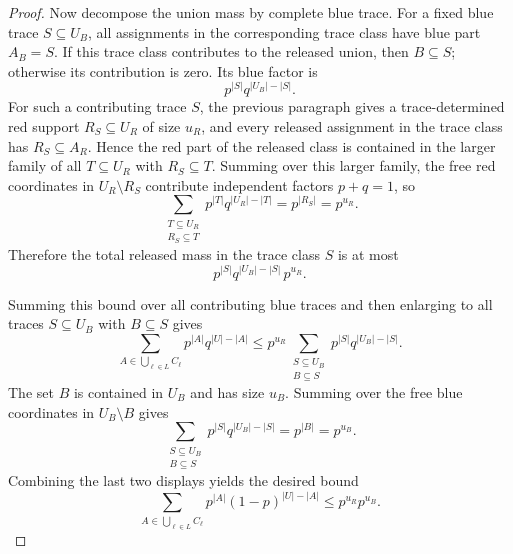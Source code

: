 \begin{proof}
Now decompose the union mass by complete blue trace.  For a fixed blue trace
\(S\subseteq U_B\), all assignments in the corresponding trace class have
blue part \(A_B=S\).  If this trace class contributes to the released union,
then \(B\subseteq S\); otherwise its contribution is zero.  Its blue factor is
\[
p^{|S|}q^{|U_B|-|S|}.
\]
For such a contributing trace \(S\), the previous paragraph gives a
trace-determined red support \(R_S\subseteq U_R\) of size \(u_R\), and every
released assignment in the trace class has \(R_S\subseteq A_R\).  Hence the
red part of the released class is contained in the larger family of all
\(T\subseteq U_R\) with \(R_S\subseteq T\).  Summing over this larger family,
the free red coordinates in \(U_R\setminus R_S\) contribute independent
factors \(p+q=1\), so
\[
\sum_{\substack{T\subseteq U_R\\ R_S\subseteq T}}
  p^{|T|}q^{|U_R|-|T|}
=p^{|R_S|}=p^{u_R}.
\]
Therefore the total released mass in the trace class \(S\) is at most
\[
p^{|S|}q^{|U_B|-|S|}\,p^{u_R}.
\]

Summing this bound over all contributing blue traces and then enlarging to
all traces \(S\subseteq U_B\) with \(B\subseteq S\) gives
\[
\sum_{A\in\bigcup_{\ell\in L}C_\ell}p^{|A|}q^{|U|-|A|}
\le
p^{u_R}
\sum_{\substack{S\subseteq U_B\\ B\subseteq S}}
  p^{|S|}q^{|U_B|-|S|}.
\]
The set \(B\) is contained in \(U_B\) and has size \(u_B\).  Summing over the
free blue coordinates in \(U_B\setminus B\) gives
\[
\sum_{\substack{S\subseteq U_B\\ B\subseteq S}}
  p^{|S|}q^{|U_B|-|S|}
=p^{|B|}=p^{u_B}.
\]
Combining the last two displays yields the desired bound
\[
\sum_{A\in\bigcup_{\ell\in L}C_\ell}p^{|A|}(1-p)^{|U|-|A|}
\le p^{u_R}p^{u_B}.
\]
\end{proof}
